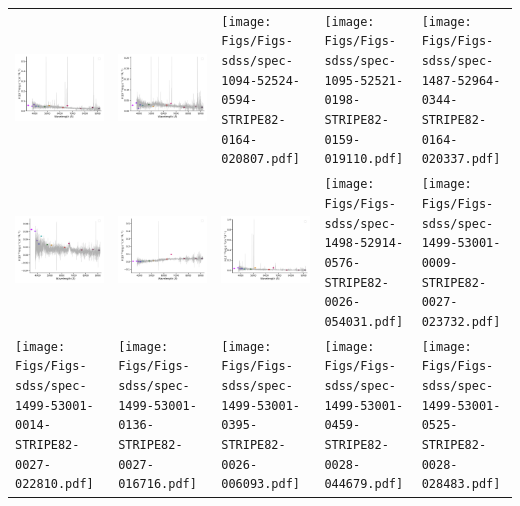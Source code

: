 \begin{center}
\begin{longtable}{l l l l l }
    \includegraphics[width=0.19\linewidth, clip]{Figs/Figs-sdss/spec-1089-52913-0386-STRIPE82-0006-034786.pdf} & \includegraphics[width=0.19\linewidth, clip]{Figs/Figs-sdss/spec-1090-52903-0539-STRIPE82-0006-015081.pdf} & \texttt{[image: Figs/Figs-sdss/spec-1094-52524-0594-STRIPE82-0164-020807.pdf]} & \texttt{[image: Figs/Figs-sdss/spec-1095-52521-0198-STRIPE82-0159-019110.pdf]} & \texttt{[image: Figs/Figs-sdss/spec-1487-52964-0344-STRIPE82-0164-020337.pdf]} \\
    \includegraphics[width=0.19\linewidth, clip]{Figs/Figs-sdss/spec-1492-52932-0553-STRIPE82-0010-005855.pdf} & \includegraphics[width=0.19\linewidth, clip]{Figs/Figs-sdss/spec-1493-52933-0207-STRIPE82-0011-008529.pdf} & \includegraphics[width=0.19\linewidth, clip]{Figs/Figs-sdss/spec-1494-52937-0249-STRIPE82-0013-010873.pdf} & \texttt{[image: Figs/Figs-sdss/spec-1498-52914-0576-STRIPE82-0026-054031.pdf]} & \texttt{[image: Figs/Figs-sdss/spec-1499-53001-0009-STRIPE82-0027-023732.pdf]} \\
    \texttt{[image: Figs/Figs-sdss/spec-1499-53001-0014-STRIPE82-0027-022810.pdf]} & \texttt{[image: Figs/Figs-sdss/spec-1499-53001-0136-STRIPE82-0027-016716.pdf]} & \texttt{[image: Figs/Figs-sdss/spec-1499-53001-0395-STRIPE82-0026-006093.pdf]} & \texttt{[image: Figs/Figs-sdss/spec-1499-53001-0459-STRIPE82-0028-044679.pdf]} & \texttt{[image: Figs/Figs-sdss/spec-1499-53001-0525-STRIPE82-0028-028483.pdf]} \\

\end{longtable}
\end{center}

